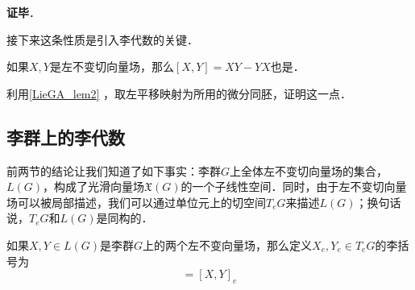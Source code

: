 





\textbf{证毕}．

接下来这条性质是引入李代数的关键．

\begin{exercise}{}
如果$X, Y$是左不变切向量场，那么$[X, Y]=XY-YX$也是．

利用\autoref{LieGA_lem2} ，取左平移映射为所用的微分同胚，证明这一点．
\end{exercise}


\subsection{李群上的李代数}

前两节的结论让我们知道了如下事实：李群$G$上全体左不变切向量场的集合，$L(G)$，构成了光滑向量场$\mathfrak{X}(G)$的一个子线性空间．同时，由于左不变切向量场可以被局部描述，我们可以通过单位元上的切空间$T_eG$来描述$L(G)$；换句话说，$T_eG$和$L(G)$是同构的．

\begin{definition}{}
如果$X, Y\in L(G)$是李群$G$上的两个左不变向量场，那么定义$X_e, Y_e\in T_eG$的李括号为
\begin{equation}
[X_e, Y_e]=[X, Y]_e
\end{equation}
\end{definition}














